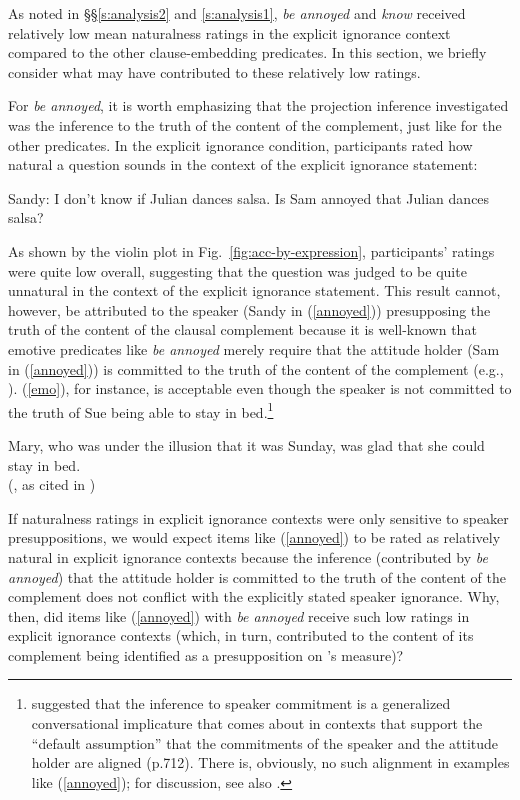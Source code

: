 \documentclass[11pt,fleqn]{article}
\newcommand{\6}{\mbox{$[\hspace*{-.6mm}[$}}
\newcommand{\9}{\mbox{$]\hspace*{-.6mm}]$}}
\newcommand{\citepos}[1]{\citeauthor{#1}'s \citeyear{#1}}
\begin{document}
As noted in \S\S \ref{s:analysis2} and \ref{s:analysis1}, \emph{be annoyed} and \emph{know} received relatively low mean naturalness ratings in the explicit ignorance context compared to the other clause-embedding predicates. In this section, we briefly consider what may have contributed to these relatively low ratings. 

For \emph{be annoyed}, it is worth emphasizing that the projection inference investigated was the inference to the truth of the content of the complement, just like for the other predicates. In the explicit ignorance condition, participants rated how natural a question sounds in the context of the explicit ignorance statement:

\begin{exe}
\ex\label{annoyed} Sandy: I don't know if Julian dances salsa. Is Sam annoyed that Julian dances salsa?
\end{exe}
As shown by the violin plot in Fig.~\ref{fig:acc-by-expression}, participants' ratings were quite low overall, suggesting that the question was judged to be quite unnatural in the context of the explicit ignorance statement. This result cannot, however, be attributed to the speaker (Sandy in (\ref{annoyed})) presupposing the truth of the content of the clausal complement because it is well-known that emotive predicates like \emph{be annoyed} merely require that the attitude holder (Sam in (\ref{annoyed})) is committed to the truth of the content of the complement (e.g., \citealt{heim92,karttunen2016,djaerv2019-thesis}). (\ref{emo}), for instance, is acceptable even though the speaker is not committed to the truth of Sue being able to stay in bed.\footnote{\citealt{karttunen2016} suggested that the inference to speaker commitment is a generalized conversational implicature that comes about in contexts that support the ``default assumption'' that the commitments of the speaker and the attitude holder are aligned (p.712). There is, obviously, no such alignment in examples like (\ref{annoyed}); for discussion, see also \citealt{djaerv2019-thesis}.}

\begin{exe}
\ex\label{emo} 
Mary, who was under the illusion that it was Sunday, was glad that she could stay in bed. \\ \hspace*{.2cm} \hfill (\citealt{klein1975}, as cited in \citealt[122]{gazdar79a})
\end{exe}
If naturalness ratings in explicit ignorance contexts were only sensitive to speaker presuppositions, we would expect items like (\ref{annoyed}) to be rated as relatively natural in explicit ignorance contexts because the inference (contributed by \emph{be annoyed}) that the attitude holder is committed to the truth of the content of the complement does not conflict with the explicitly stated speaker ignorance. Why, then, did items like (\ref{annoyed}) with \emph{be annoyed} receive such low  ratings in explicit ignorance contexts (which, in turn, contributed to the content of its complement being identified as a presupposition on \citepos{mandelkern-etal2020} measure)? 
\end{document}
